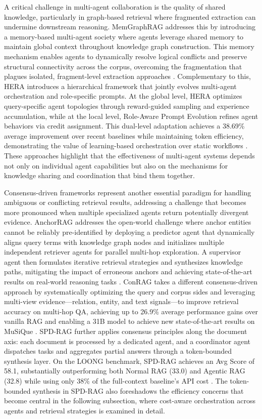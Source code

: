 \documentclass[11pt]{article}
\begin{document}
A critical challenge in multi-agent collaboration is the quality of shared knowledge, particularly in graph-based retrieval where fragmented extraction can undermine downstream reasoning. MemGraphRAG addresses this by introducing a memory-based multi-agent society where agents leverage shared memory to maintain global context throughout knowledge graph construction. This memory mechanism enables agents to dynamically resolve logical conflicts and preserve structural connectivity across the corpus, overcoming the fragmentation that plagues isolated, fragment-level extraction approaches \cite{ref322}. Complementary to this, HERA introduces a hierarchical framework that jointly evolves multi-agent orchestration and role-specific prompts. At the global level, HERA optimizes query-specific agent topologies through reward-guided sampling and experience accumulation, while at the local level, Role-Aware Prompt Evolution refines agent behaviors via credit assignment. This dual-level adaptation achieves a 38.69\% average improvement over recent baselines while maintaining token efficiency, demonstrating the value of learning-based orchestration over static workflows \cite{ref323}. These approaches highlight that the effectiveness of multi-agent systems depends not only on individual agent capabilities but also on the mechanisms for knowledge sharing and coordination that bind them together.

Consensus-driven frameworks represent another essential paradigm for handling ambiguous or conflicting retrieval results, addressing a challenge that becomes more pronounced when multiple specialized agents return potentially divergent evidence. AnchorRAG addresses the open-world challenge where anchor entities cannot be reliably pre-identified by deploying a predictor agent that dynamically aligns query terms with knowledge graph nodes and initializes multiple independent retriever agents for parallel multi-hop exploration. A supervisor agent then formulates iterative retrieval strategies and synthesizes knowledge paths, mitigating the impact of erroneous anchors and achieving state-of-the-art results on real-world reasoning tasks \cite{ref324}. ConRAG takes a different consensus-driven approach by systematically optimizing the query and corpus sides and leveraging multi-view evidence---relation, entity, and text signals---to improve retrieval accuracy on multi-hop QA, achieving up to 26.9\% average performance gains over vanilla RAG and enabling a 31B model to achieve new state-of-the-art results on MuSiQue \cite{ref325}. SPD-RAG further applies consensus principles along the document axis: each document is processed by a dedicated agent, and a coordinator agent dispatches tasks and aggregates partial answers through a token-bounded synthesis layer. On the LOONG benchmark, SPD-RAG achieves an Avg Score of 58.1, substantially outperforming both Normal RAG (33.0) and Agentic RAG (32.8) while using only 38\% of the full-context baseline's API cost \cite{ref326}. The token-bounded synthesis in SPD-RAG also foreshadows the efficiency concerns that become central in the following subsection, where cost-aware orchestration across agents and retrieval strategies is examined in detail.
\end{document}
